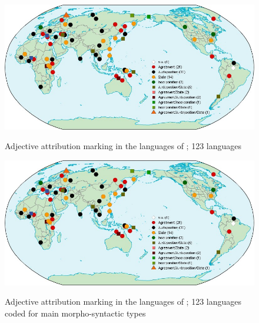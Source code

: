 \newpage
\begin{figure}
    
        \caption[Adjective attribution marking, Europe]{Adjective attribution marking in the languages of ; 123 languages}

\includegraphics[width=\textwidth]{figures/WorldMapTyp.jpg}%
\label{EUMap}
\end{figure}

\newpage
\begin{figure}
    
        \caption[Adjective attribution marking, Europe, main types]{Adjective attribution marking in the languages of ; 123 languages coded for main morpho-syntactic types}

\includegraphics[width=\textwidth]{figures/WorldMapTyp.jpg}%
\label{EUMapTyp}
\end{figure}
